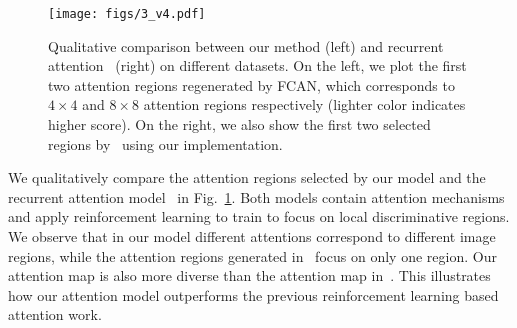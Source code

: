 \documentclass[10pt,twocolumn,letterpaper]{article}
\begin{document}
\begin{figure}[t]
\begin{center}
\texttt{[image: figs/3\_v4.pdf]}
\end{center}
\caption{Qualitative comparison between our method (left) and recurrent attention~\cite{bd3} (right) on different datasets.
On the left, we plot the first two attention regions regenerated by FCAN, which corresponds to $4\times4$ and $8\times8$ attention regions respectively (lighter color indicates higher score).
On the right, we also show the first two selected regions by~\cite{bd3} using our implementation.
}
\label{fig:attention_illustration}
\vspace{-8pt}
\end{figure}


We qualitatively compare the attention regions selected by our model and the recurrent attention model~\cite{bd3} in Fig.~\ref{fig:attention_illustration}.
Both models contain attention mechanisms and apply reinforcement learning to train to focus on local discriminative regions.
We observe that in our model different attentions correspond to different image regions, while the attention regions generated in~\cite{bd3} focus on only one region.
Our attention map is also more diverse than the attention map in~\cite{bd3}.
This illustrates how our attention model outperforms the previous reinforcement learning based attention work.

\end{document}
